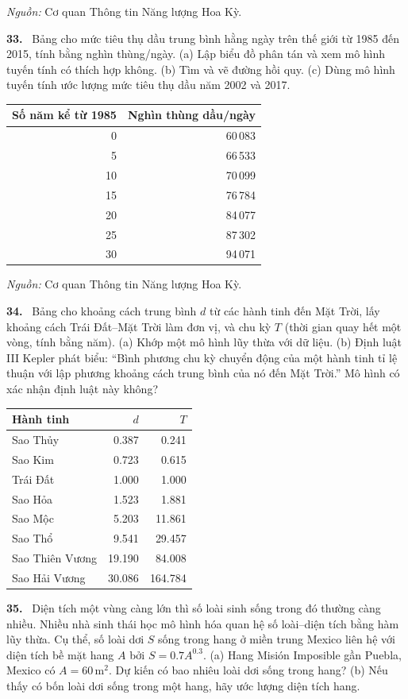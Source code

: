 \documentclass[12pt,a4paper]{article}
\newcommand{\bt}[1]{\par\smallskip\noindent\textbf{#1.}\ }
\begin{document}
\noindent\textit{Nguồn:} Cơ quan Thông tin Năng lượng Hoa Kỳ.
\bt{33} Bảng cho mức tiêu thụ dầu trung bình hằng ngày trên thế giới từ 1985 đến 2015, tính bằng nghìn thùng/ngày. (a) Lập biểu đồ phân tán và xem mô hình tuyến tính có thích hợp không. (b) Tìm và vẽ đường hồi quy. (c) Dùng mô hình tuyến tính ước lượng mức tiêu thụ dầu năm 2002 và 2017.
\begin{center}\begin{tabular}{rr}\toprule
Số năm kể từ 1985&Nghìn thùng dầu/ngày\\\midrule
0&60\,083\\5&66\,533\\10&70\,099\\15&76\,784\\20&84\,077\\25&87\,302\\30&94\,071\\\bottomrule\end{tabular}\end{center}
\noindent\textit{Nguồn:} Cơ quan Thông tin Năng lượng Hoa Kỳ.
\bt{34} Bảng cho khoảng cách trung bình $d$ từ các hành tinh đến Mặt Trời, lấy khoảng cách Trái Đất–Mặt Trời làm đơn vị, và chu kỳ $T$ (thời gian quay hết một vòng, tính bằng năm). (a) Khớp một mô hình lũy thừa với dữ liệu. (b) Định luật III Kepler phát biểu: ``Bình phương chu kỳ chuyển động của một hành tinh tỉ lệ thuận với lập phương khoảng cách trung bình của nó đến Mặt Trời.'' Mô hình có xác nhận định luật này không?
\begin{center}\begin{tabular}{lrr}\toprule Hành tinh&$d$&$T$\\\midrule
Sao Thủy&0.387&0.241\\Sao Kim&0.723&0.615\\Trái Đất&1.000&1.000\\Sao Hỏa&1.523&1.881\\Sao Mộc&5.203&11.861\\Sao Thổ&9.541&29.457\\Sao Thiên Vương&19.190&84.008\\Sao Hải Vương&30.086&164.784\\\bottomrule\end{tabular}\end{center}
\bt{35} Diện tích một vùng càng lớn thì số loài sinh sống trong đó thường càng nhiều. Nhiều nhà sinh thái học mô hình hóa quan hệ số loài–diện tích bằng hàm lũy thừa. Cụ thể, số loài dơi $S$ sống trong hang ở miền trung Mexico liên hệ với diện tích bề mặt hang $A$ bởi $S=0.7A^{0.3}$. (a) Hang Misión Imposible gần Puebla, Mexico có $A=60\,\mathrm m^2$. Dự kiến có bao nhiêu loài dơi sống trong hang? (b) Nếu thấy có bốn loài dơi sống trong một hang, hãy ước lượng diện tích hang.
\end{document}
